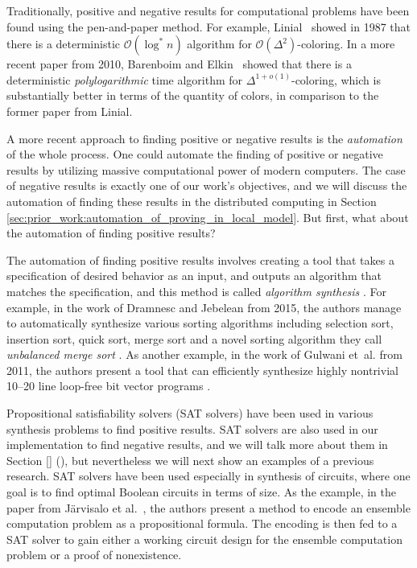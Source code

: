 Traditionally, positive and negative results for computational problems have been found using the pen-and-paper method.
For example, Linial\ \cite{DBLP:conf/focs/Linial87} showed in 1987 that there is a deterministic \(\mathcal{O}(\log^* n)\) algorithm for \(\mathcal{O}(\Delta^2)\)-coloring.
In a more recent paper from 2010, Barenboim and Elkin\ \cite{DBLP:conf/podc/BarenboimE10} showed that there is a deterministic \emph{polylogarithmic} time algorithm for \(\Delta^{1 + o(1)}\)-coloring, which is substantially better in terms of the quantity of colors, in comparison to the former paper \cite{DBLP:conf/focs/Linial87} from Linial.

A more recent approach to finding positive or negative results is the \emph{automation} of the whole process.
One could automate the finding of positive or negative results by utilizing massive computational power of modern computers.
The case of negative results is exactly one of our work's objectives, and we will discuss the automation of finding these results in the distributed computing in Section \ref{sec:prior_work:automation_of_proving_in_local_model}.
But first, what about the automation of finding positive results?

The automation of finding positive results involves creating a tool that takes a specification of desired behavior as an input, and outputs an algorithm that matches the specification, and this method is called \emph{algorithm synthesis} \cite{DBLP:phd/basesearch/Rybicki16}.
For example, in the work of Dramnesc and Jebelean from 2015, the authors manage to automatically synthesize various sorting algorithms including selection sort, insertion sort, quick sort, merge sort and a novel sorting algorithm they call \emph{unbalanced merge sort} \cite{DBLP:journals/jsc/DramnescJ15}.
As another example, in the work of Gulwani et~al. from 2011, the authors present a tool that can efficiently synthesize highly nontrivial 10--20 line loop-free bit vector programs \cite{DBLP:conf/pldi/GulwaniJTV11}.

Propositional satisfiability solvers (SAT solvers) have been used in various synthesis problems to find positive results.
SAT solvers are also used in our implementation to find negative results, and we will talk more about them in Section \ref{} (), but nevertheless we will next show an examples of a previous research.
SAT solvers have been used especially in synthesis of circuits, where one goal is to find optimal Boolean circuits in terms of size.
As the example, in the paper from Järvisalo et al.\ \cite{DBLP:conf/sat/JarvisaloKKK12}, the authors present a method to encode an ensemble computation problem as a propositional formula.
The encoding is then fed to a SAT solver to gain either a working circuit design for the ensemble computation problem or a proof of nonexistence.

